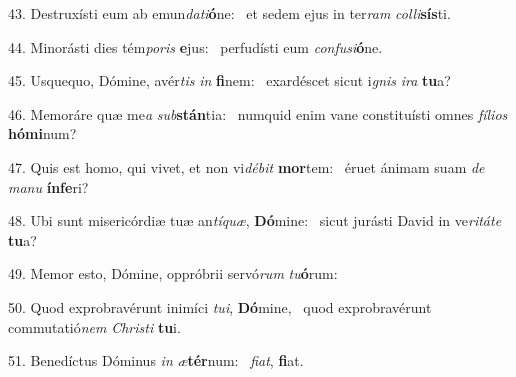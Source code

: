 43. Destruxísti eum ab emun\textit{da}\textit{ti}\textbf{ó}ne: \ast\  et sedem ejus in ter\textit{ram} \textit{col}\textit{li}\textbf{sís}ti.\

44. Minorásti dies tém\textit{po}\textit{ris} \textbf{e}jus: \ast\  perfudísti eum \textit{con}\textit{fu}\textit{si}\textbf{ó}ne.\

45. Usquequo, Dómine, avér\textit{tis} \textit{in} \textbf{fi}nem: \ast\  exardéscet sicut i\textit{gnis} \textit{i}\textit{ra} \textbf{tu}a?\

46. Memoráre quæ me\textit{a} \textit{sub}\textbf{stán}tia: \ast\  numquid enim vane constituísti omnes \textit{fí}\textit{li}\textit{os} \textbf{hó}\textbf{mi}num?\

47. Quis est homo, qui vivet, et non vi\textit{dé}\textit{bit} \textbf{mor}tem: \ast\  éruet ánimam suam \textit{de} \textit{ma}\textit{nu} \textbf{ín}\textbf{fe}ri?\

48. Ubi sunt misericórdiæ tuæ an\textit{tí}\textit{quæ}, \textbf{Dó}mine: \ast\  sicut jurásti David in ve\textit{ri}\textit{tá}\textit{te} \textbf{tu}a?\

49. Memor esto, Dómine, oppróbrii servó\textit{rum} \textit{tu}\textbf{ó}rum: \ast\  \

50. Quod exprobravérunt inimíci \textit{tu}\textit{i}, \textbf{Dó}mine, \ast\  quod exprobravérunt commutatió\textit{nem} \textit{Chris}\textit{ti} \textbf{tu}i.\

51. Benedíctus Dóminus \textit{in} \textit{æ}\textbf{tér}num: \ast\  \textit{fi}\textit{at}, \textbf{fi}at.\

